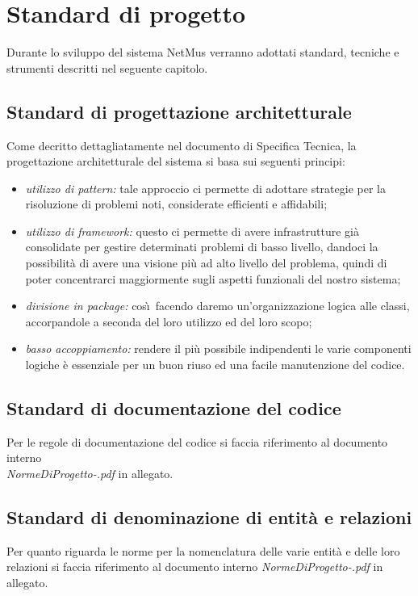 

\chapter{Standard di progetto}
\thispagestyle{fancy} %
Durante lo sviluppo del sistema NetMus verranno adottati standard,
tecniche e strumenti descritti nel seguente capitolo.

\section{Standard di progettazione architetturale}
Come decritto dettagliatamente nel documento di Specifica Tecnica, la
progettazione architetturale del sistema si basa sui seguenti principi:

\begin{itemize}
  \item \emph{utilizzo di pattern:} tale approccio ci permette di adottare
  strategie per la risoluzione di problemi noti, considerate efficienti e affidabili;
  \item \emph{utilizzo di framework:} questo ci permette di avere infrastrutture
  gi\`a consolidate per gestire determinati problemi di basso livello, dandoci
  la possibilit\`a di avere una visione pi\`u ad alto livello del problema,
  quindi di poter concentrarci maggiormente sugli aspetti funzionali del nostro
  sistema;
  \item \emph{divisione in package:} cos\`\i\ facendo daremo un'organizzazione
  logica alle classi, accorpandole a seconda del loro utilizzo ed del loro
  scopo;
  \item \emph{basso accoppiamento:} rendere il pi\`u possibile indipendenti le
  varie componenti logiche \`e essenziale per un buon riuso ed una facile
  manutenzione del codice.
\end{itemize}

\section{Standard di documentazione del codice}
Per le regole di documentazione del codice si faccia riferimento al documento
interno\\ \emph{NormeDiProgetto-\versionenormeprogetto.pdf} in allegato.

\section{Standard di denominazione di entit\`a e relazioni}
Per quanto riguarda le norme per la nomenclatura delle varie entit\`a e delle
loro relazioni si faccia riferimento al documento interno
\emph{NormeDiProgetto-\versionenormeprogetto.pdf} in allegato.

